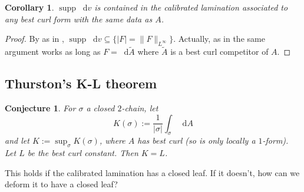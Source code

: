 \documentclass[reqno,11pt]{amsart}
\newcommand*\dif{\mathop{}\!\mathrm{d}}
\DeclareMathOperator{\supp}{supp}
\newtheorem{corollary}[theorem]{Corollary}
\newtheorem{conjecture}[theorem]{Conjecture}
\theoremstyle{definition}
\numberwithin{equation}{section}
\begin{document}
\begin{corollary}
$\supp \dif v$ is contained in the calibrated lamination associated to any best curl form with the same data as $A$.
\end{corollary}
\begin{proof}
By as in \cite[Theorem 6.1]{daskalopoulos2020transverse}, $\supp \dif v \subseteq \{|F| = \|F\|_{L^\infty}\}$.
Actually, as in \cite[Corollary 6.8]{daskalopoulos2020transverse} the same argument works as long as $F = \dif \tilde A$ where $\tilde A$ is a best curl competitor of $A$.
\end{proof}

\subsection{Thurston's K-L theorem}
\begin{conjecture}
For $\sigma$ a closed $2$-chain, let
$$K(\sigma) := \frac{1}{|\sigma|} \int_\sigma \dif A$$
and let $K := \sup_\sigma K(\sigma)$, where $A$ has best curl (so is only locally a $1$-form).
Let $L$ be the best curl constant. Then $K = L$.
\end{conjecture}

This holds if the calibrated lamination has a closed leaf.
If it doesn't, how can we deform it to have a closed leaf?



\printbibliography
\end{document}
